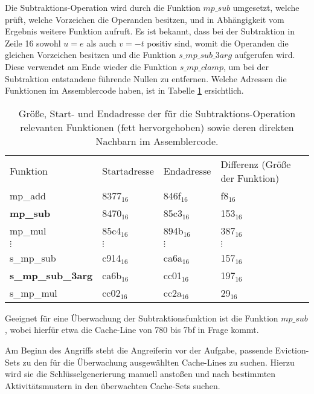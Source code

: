 Die Subtraktions-Operation wird durch die Funktion $mp\_sub$ umgesetzt, welche prüft, welche Vorzeichen die Operanden besitzen, und in Abhängigkeit vom Ergebnis weitere Funktion aufruft.
Es ist bekannt, dass bei der Subtraktion in Zeile 16 sowohl $u=e$ als auch $v=-t$ positiv sind, womit die Operanden die gleichen Vorzeichen besitzen und die Funktion $s\_mp\_sub\_3arg$ aufgerufen wird.
Diese verwendet am Ende wieder die Funktion $s\_mp\_clamp$, um bei der Subtraktion entstandene führende Nullen zu entfernen.
Welche Adressen die Funktionen im Assemblercode haben, ist in Tabelle \ref{tbl:assOffsetSub} ersichtlich. 


\begin{table}[h]
\caption{Größe, Start- und Endadresse der für die Subtraktions-Operation relevanten Funktionen (fett hervorgehoben) sowie deren direkten Nachbarn im Assemblercode.}
\label{tbl:assOffsetSub}
\begin{tabular}{llll}
Funktion         & Startadresse & Endadresse & Differenz (Größe der Funktion) \\[10pt]
mp\_add & 8377$_{16}$ & 846f$_{16}$ & f8$_{16}$\\
\textbf{mp\_sub} & 8470$_{16}$ & 85c3$_{16}$ & 153$_{16}$ \\
mp\_mul & 85c4$_{16}$ & 894b$_{16}$ & 387$_{16}$ \\
$\vdots$               &  $\vdots$             &    $\vdots$         &     $\vdots$   \\
s\_mp\_sub       & c914$_{16}$         & ca6a$_{16}$       & 157$_{16}$   \\
\textbf{s\_mp\_sub\_3arg} & ca6b$_{16}$         & cc01$_{16}$       & 197$_{16}$   \\
s\_mp\_mul       & cc02$_{16}$         & cc2a$_{16}$       & 29$_{16}$   
\end{tabular}
\end{table}

Geeignet für eine Überwachung der Subtraktionsfunktion ist die Funktion $mp\_sub$, wobei hierfür etwa die Cache-Line von 780 bis 7bf in Frage kommt.

Am Beginn des Angriffs steht die Angreiferin vor der Aufgabe, passende Eviction-Sets zu den für die Überwachung ausgewählten Cache-Lines zu suchen.
Hierzu wird sie die Schlüsselgenerierung manuell anstoßen und nach bestimmten Aktivitätsmustern in den überwachten Cache-Sets suchen.

